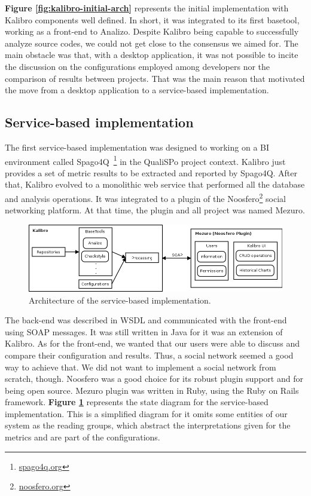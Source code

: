 \textbf{Figure \ref{fig:kalibro-initial-arch}} represents the initial
implementation with Kalibro components well defined. In short, it was
integrated to its first basetool, working as a front-end to Analizo. Despite
Kalibro being capable to successfully analyze source codes, we could not get
close to the consensus we aimed for. The main obstacle was that, with a desktop
application, it was not possible to incite the discussion on the configurations
employed among developers nor the comparison of results between projects. That
was the main reason that motivated the move from a desktop application to a
service-based implementation.

\subsection{Service-based implementation}
\label{subsec:service-based-implementation}

The first service-based implementation was designed to working on a BI
environment called Spago4Q~\footnote{\url{spago4q.org}} in the QualiSPo project
context. Kalibro just provides a set of metric results to be extracted and
reported by Spago4Q. After that, Kalibro evolved to a monolithic web service that performed all the
database and analysis operations. It was integrated to a plugin of the
Noosfero\footnote{\url{noosfero.org}} social networking platform. At that time,
the plugin and all project was named Mezuro.

\begin{figure}[htb]
  \centering
  \includegraphics[width=.85\textwidth]{images/mezuro-noosfero-arch.png}
  \caption{Architecture of the service-based implementation.}
  \label{fig:mezuro-noosfero-arch}
\end{figure}

\vspace{-0.5cm}

The back-end was described in WSDL and communicated with the front-end using
SOAP messages.  It was still written in Java for it was an extension of
Kalibro. As for the front-end, we wanted that our users were able to discuss
and compare their configuration and results. Thus, a social network seemed a
good way to achieve that. We did not want to implement a social network from
scratch, though.  Noosfero was a good choice for its robust plugin support and
for being open source. Mezuro plugin was written in Ruby, using the Ruby on
Rails framework. \textbf{Figure \ref{fig:mezuro-noosfero-arch}} represents the
state diagram for the service-based implementation. This is a simplified
diagram for it omits some entities of our system as the reading groups, which
abstract the interpretations given for the metrics and are part of the
configurations.

